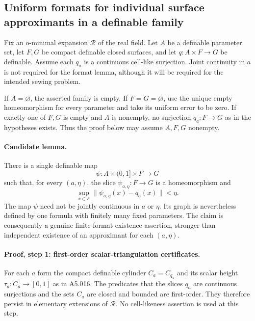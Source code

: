 \subsection*{Uniform formats for individual surface approximants in a definable family}

Fix an o-minimal expansion $\mathcal R$ of the real field. Let $A$ be a
definable parameter set, let $F,G$ be compact definable closed surfaces,
and let $q:A\times F\to G$ be definable. Assume each $q_a$ is a continuous
cell-like surjection. Joint continuity in $a$ is not required for the
format lemma, although it will be required for the intended sewing problem.

If $A=\varnothing$, the asserted family is empty. If $F=G=\varnothing$,
use the unique empty homeomorphism for every parameter and take its uniform
error to be zero. If exactly one of $F,G$ is empty and $A$ is nonempty, no
surjection $q_a:F\to G$ as in the hypotheses exists. Thus the proof below
may assume $A,F,G$ nonempty.

\paragraph{Candidate lemma.}
There is a single definable map
\[
 \psi:A\times(0,1]\times F\longrightarrow G
 \tag{US.1}
\]
such that, for every $(a,\eta)$, the slice $\psi_{a,\eta}:F\to G$ is a
homeomorphism and
\[
 \sup_{x\in F}\|\psi_{a,\eta}(x)-q_a(x)\|<\eta.
 \tag{US.2}
\]
The map $\psi$ need not be jointly continuous in $a$ or $\eta$. Its graph
is nevertheless defined by one formula with finitely many fixed parameters.
The claim is consequently a genuine finite-format existence assertion,
stronger than independent existence of an approximant for each $(a,\eta)$.

\paragraph{Proof, step 1: first-order scalar-triangulation certificates.}
For each $a$ form the compact definable cylinder $C_a=C_{q_a}$ and its scalar
height $\tau_a:C_a\to[0,1]$ as in A5.016. The predicates that the slices
$q_a$ are continuous surjections and the sets $C_a$ are closed and bounded
are first-order. They therefore persist in elementary extensions of
$\mathcal R$. No cell-likeness assertion is used at this step.

